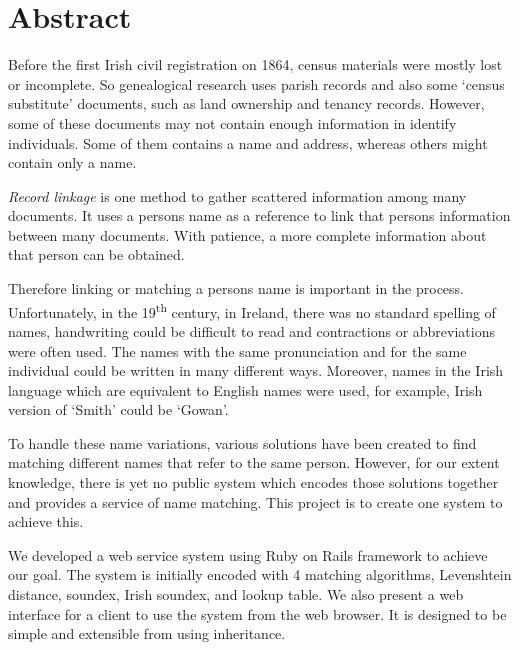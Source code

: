

\begingroup
\let\clearpage\relax
\let\cleardoublepage\relax
\let\cleardoublepage\relax

\chapter*{Abstract}

Before the first Irish civil registration on 1864, census materials
were mostly lost or incomplete. So genealogical research uses
parish records and also some `census substitute' documents,
such as land ownership and tenancy records. However, some of these documents
may not contain enough information in identify individuals.
Some of them contains a name and address,
whereas others might contain only a name.

\emph{Record linkage} is one method to gather scattered information among many documents.
It uses a person\textquotesingle s name as a reference to link that
person\textquotesingle s information between many documents. With patience,
a more complete information about that person can be obtained.

Therefore linking or matching a person\textquotesingle s name is important in the process.
Unfortunately, in the 19\textsuperscript{th} century, in Ireland, there was no standard
spelling of names, handwriting could be difficult to read
and contractions or abbreviations were often used. The names with the same
pronunciation and for the same individual could be written in many different ways.
Moreover, names in the Irish language which are equivalent to English names
were used, for example, Irish version of `Smith' could be `Gowan'.

To handle these name variations, various solutions have been created to find
matching different names that refer to the same person. However,
for our extent knowledge, there is yet no public system which encodes
those solutions together and provides a service of name matching.
This project is to create one system to achieve this.

We developed a web service system using Ruby on Rails framework
to achieve our goal. The system is initially encoded with 4 matching algorithms,
Levenshtein distance, soundex, Irish soundex, and lookup table.
We also present a web interface for a client to use the system
from the web browser. It is designed to be simple and extensible from using
inheritance.

\endgroup
\vfill
